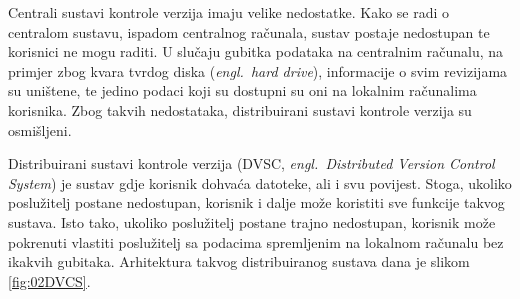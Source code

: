 Centrali sustavi kontrole verzija imaju velike nedostatke. Kako se radi o centralom sustavu, ispadom
centralnog računala, sustav postaje nedostupan te korisnici ne mogu raditi. U slučaju gubitka
podataka na centralnim računalu, na primjer zbog kvara tvrdog diska (\textit{engl.~hard drive}),
informacije o svim revizijama su uništene, te jedino podaci koji su dostupni su oni na lokalnim
računalima korisnika. Zbog takvih nedostataka, distribuirani sustavi kontrole verzija su osmišljeni.

Distribuirani sustavi kontrole verzija (DVSC, \textit{engl.~Distributed Version Control System}) je
sustav gdje korisnik dohvaća datoteke, ali i svu povijest. Stoga, ukoliko poslužitelj postane
nedostupan, korisnik i dalje može koristiti sve funkcije takvog sustava. Isto tako, ukoliko
poslužitelj postane trajno nedostupan, korisnik može pokrenuti vlastiti poslužitelj sa podacima
spremljenim na lokalnom računalu bez ikakvih gubitaka. Arhitektura takvog distribuiranog sustava
dana je slikom \ref{fig:02DVCS}.

